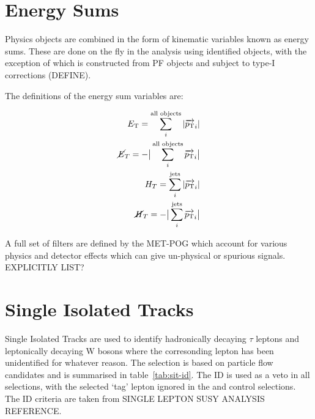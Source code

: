 \section{Energy Sums}  %
\label{sec:objects_energy_sums}
Physics objects are combined in the form of kinematic variables known as energy 
sums. These are done on the fly in the analysis using identified objects, with
the exception of \met which is constructed from PF objects and subject to type-I
corrections (DEFINE).

The definitions of the energy sum variables are:

\begin{equation}
    \begin{split}
    {E_{\text T}} = \sum_{i}^{\textrm{all objects}} |{\overrightarrow{p_{\text T}}}_i|\\
    \cancel{E}_T = -\big|\sum_{i}^{\textrm{all objects}} {\overrightarrow{p_{\text T}}}_i\big|\\
    H_T = \sum_{i}^{\textrm{jets}} |{\overrightarrow{p_{\text T}}}_i|\\
    \cancel{H}_T = -\big|\sum_{i}^{\textrm{jets}} {\overrightarrow{p_{\text T}}}_i\big|\\
    \end{split}
\label{eq:energy_sums}
\end{equation}

A full set of \met filters are defined by the MET-POG which account for various 
physics and detector effects which can give un-physical or spurious \met 
signals. EXPLICITLY LIST?

\section{Single Isolated Tracks}  %
\label{sec:objects_sit}
Single Isolated Tracks are used to identify hadronically decaying $\tau$ leptons
and leptonically decaying W bosons where the corresonding lepton has been
unidentified for whatever reason. 
The selection is based on particle flow candidates and is summarised in
table~\ref{tab:sit-id}. The ID is used as a veto in all selections, with the 
selected `tag' lepton ignored in the \mj and \mmj control selections. The ID 
criteria are taken from SINGLE LEPTON SUSY ANALYSIS REFERENCE.

